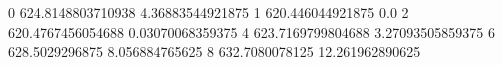 0 624.8148803710938 4.36883544921875
1 620.446044921875 0.0
2 620.4767456054688 0.03070068359375
4 623.7169799804688 3.27093505859375
6 628.5029296875 8.056884765625
8 632.7080078125 12.261962890625
